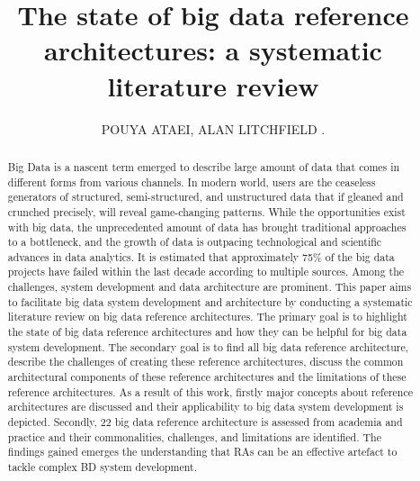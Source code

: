 \documentclass{ieeeaccess}
\begin{document}

\title{The state of big data reference architectures: a
systematic literature review}

\author{\uppercase{Pouya Ataei},
\uppercase{Alan Litchfield} .}

\address[1]{School of Engineering, Computer and Mathematical Sciences, Auckland University of Technology, Auckland, New Zealand (e-mail: pouya.ataei@aut.ac.nz)}

\address[2]{Service and Cloud Computing Research Lab, Auckland University of Technology, Auckland, New Zealand (e-mail: alan.litchfield@aut.ac.nz)}

\begin{abstract}
    Big Data is a nascent term emerged to describe large amount of data that comes in different forms from various channels. In modern world, users are the ceaseless generators of structured, semi-structured, and unstructured data that if gleaned and crunched precisely, will reveal game-changing patterns. While the opportunities exist with big data, the unprecedented amount of data has brought traditional approaches to a bottleneck, and the growth of data is outpacing technological and scientific advances in data analytics. It is estimated that approximately 75\% of the big data projects have failed within the last decade according to multiple sources. Among the challenges, system development and data architecture are prominent. This paper aims to facilitate big data system development and architecture by conducting a systematic literature review on big data reference architectures. The primary goal is to highlight the state of big data reference architectures and how they can be helpful for big data system development. The secondary goal is to find all big data reference architecture, describe the challenges of creating these reference architectures, discuss the common architectural components of these reference architectures and the limitations of these reference architectures. As a result of this work, firstly major concepts about reference architectures are discussed and their applicability to big data system development is depicted. Secondly, 22 big data reference architecture is assessed from academia and practice and their commonalities, challenges, and limitations are identified. The findings gained emerges the understanding that RAs can be an effective artefact to tackle complex BD system development.
\end{abstract}
\end{document}

